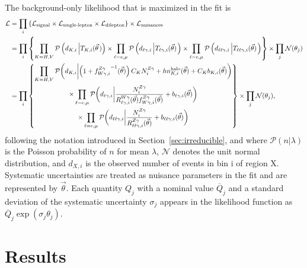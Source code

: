 The background-only likelihood that is maximized in the fit is
\begin{equation}
\begin{aligned}
  \mathcal{L} & = \prod_{i} \left\{ \mathcal{L_{\text{signal}}} \times \mathcal{L_{\text{single-lepton}}} \times \mathcal{L_{\text{dilepton}}} \right\} \times \mathcal{L_{\text{nuisances}}} \\
  & = \prod_{i} \left\{
    \prod_{K=H,V} \mathcal{P}\left( d_{K, i} \left| \TK[,i] (\vec{\theta} \right.) \right) \times \prod_{\ell=\Pe,\Pgm} \mathcal{P}\left( d_{\ell\Pgg, i} \left| \Tl[,i] (\vec{\theta}) \right. \right)
    \times \prod_{\ell=\Pe,\Pgm} \mathcal{P}\left( d_{\ell\ell\Pgg, i} \left| \Tll[,i] (\vec{\theta}) \right. \right)
    \right\}  \times \prod_{j} \mathcal{N}(\theta_j) \\
  & = \prod_{i} \left\{
  \begin{gathered}
    \prod\limits_{K=H,V} \mathcal{P}\biggl( d_{K, i} \biggl| \left(1 + {\fZW[,i]}^{-1}(\vec{\theta})\right) C_{K} \NZg[i] + h \nhalo[,i](\vec{\theta}) + C_{K} b_{K, i}(\vec{\theta}) \biggr. \biggr) \\
    \times \prod\limits_{\ell=\Pe,\Pgm} \mathcal{P}\biggl( d_{\ell\Pgg, i} \biggl| \frac{\NZg[i]}{\RWl[,i](\vec{\theta}) \fZW[,i] (\vec{\theta})} + b_{\ell\Pgg, i}(\vec{\theta}) \biggr. \biggr) \\
    \times \prod\limits_{\ell=\Pe,\Pgm} \mathcal{P}\biggl( d_{\ell\ell\Pgg, i} \biggl| \frac{\NZg[i]}{\RZll[,i](\vec{\theta})} + b_{\ell\ell\Pgg, i}(\vec{\theta}) \biggr. \biggr)
  \end{gathered} \right\}
  \times \prod_{j} \mathcal{N}(\theta_j),
\end{aligned}
\end{equation}
following the notation introduced in Section~\ref{sec:irreducible}, and where $\mathcal{P}
(n\vert\lambda)$ is the Poisson probability of $n$ for mean $\lambda$, $\mathcal{N}$ denotes the unit normal distribution, and $d_{X,i}$ is the observed number of events in bin i of region X.
Systematic uncertainties are treated as nuisance parameters in the fit and are represented by
$\vec{\theta}$.
Each quantity $Q_{j}$ with a nominal value $\overline{Q}_{j}$ and a standard deviation of the systematic uncertainty $\sigma_{j}$ appears in the likelihood function as $\overline{Q}_{j}\exp(\sigma_{j}\theta_{j})$.

\section{Results}
\label{sec:results}

